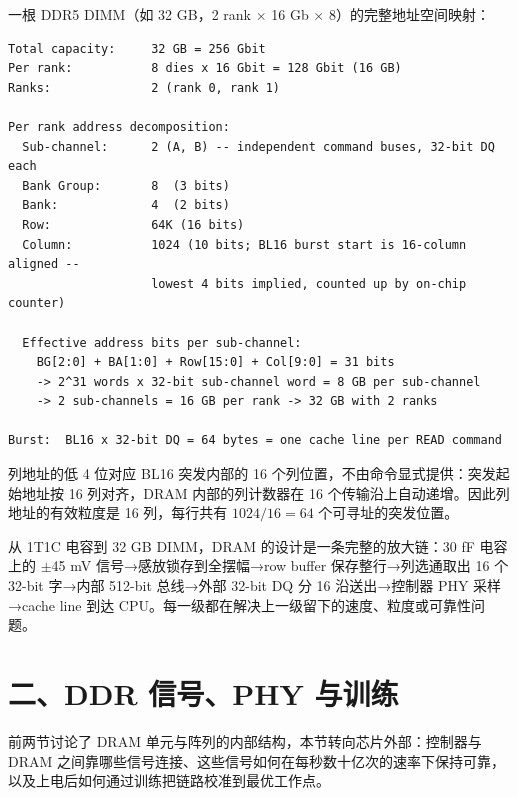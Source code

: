 

一根 DDR5 DIMM（如 32 GB，2 rank $\times$ 16 Gb $\times$ 8）的完整地址空间映射：

\begin{lstlisting}[numbers=none,caption={DDR5 32GB DIMM 地址分解}]
Total capacity:     32 GB = 256 Gbit
Per rank:           8 dies x 16 Gbit = 128 Gbit (16 GB)
Ranks:              2 (rank 0, rank 1)

Per rank address decomposition:
  Sub-channel:      2 (A, B) -- independent command buses, 32-bit DQ each
  Bank Group:       8  (3 bits)
  Bank:             4  (2 bits)
  Row:              64K (16 bits)
  Column:           1024 (10 bits; BL16 burst start is 16-column aligned --
                    lowest 4 bits implied, counted up by on-chip counter)

  Effective address bits per sub-channel:
    BG[2:0] + BA[1:0] + Row[15:0] + Col[9:0] = 31 bits
    -> 2^31 words x 32-bit sub-channel word = 8 GB per sub-channel
    -> 2 sub-channels = 16 GB per rank -> 32 GB with 2 ranks

Burst:  BL16 x 32-bit DQ = 64 bytes = one cache line per READ command
\end{lstlisting}

列地址的低 4 位对应 BL16 突发内部的 16 个列位置，不由命令显式提供：突发起始地址按 16 列对齐，DRAM 内部的列计数器在 16 个传输沿上自动递增。因此列地址的有效粒度是 16 列，每行共有 $1024 / 16 = 64$ 个可寻址的突发位置。

\begin{keyidea}
从 1T1C 电容到 32 GB DIMM，DRAM 的设计是一条完整的放大链：30 fF 电容上的 $\pm$45 mV 信号→感放锁存到全摆幅→row buffer 保存整行→列选通取出 16 个 32-bit 字→内部 512-bit 总线→外部 32-bit DQ 分 16 沿送出→控制器 PHY 采样→cache line 到达 CPU。每一级都在解决上一级留下的速度、粒度或可靠性问题。
\end{keyidea}

\section{二、DDR 信号、PHY 与训练}


前两节讨论了 DRAM 单元与阵列的内部结构，本节转向芯片外部：控制器与 DRAM 之间靠哪些信号连接、这些信号如何在每秒数十亿次的速率下保持可靠，以及上电后如何通过训练把链路校准到最优工作点。

